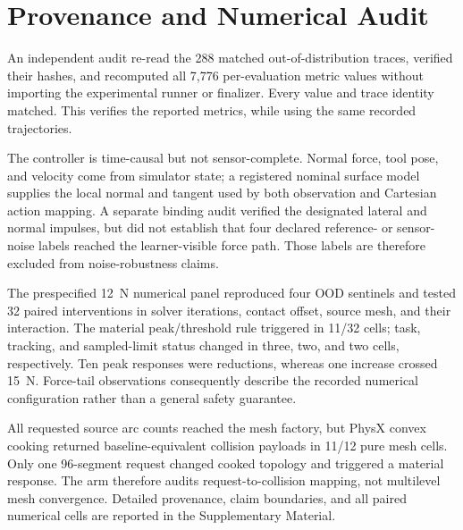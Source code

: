 \section{Provenance and Numerical Audit}
\label{sec:credibility_audit}

An independent audit re-read the 288 matched out-of-distribution traces,
verified their hashes, and recomputed all 7,776 per-evaluation metric values
without importing the experimental runner or finalizer. Every value and trace
identity matched. This verifies the reported metrics, while using the same
recorded trajectories.

The controller is time-causal but not sensor-complete. Normal force, tool pose,
and velocity come from simulator state; a registered nominal surface model
supplies the local normal and tangent used by both observation and Cartesian
action mapping. A separate binding audit verified the designated lateral and
normal impulses, but did not establish that four declared reference- or
sensor-noise labels reached the learner-visible force path. Those labels are
therefore excluded from noise-robustness claims.

The prespecified 12~N numerical panel reproduced four OOD sentinels and tested
32 paired interventions in solver iterations, contact offset, source mesh, and
their interaction. The material peak/threshold rule triggered in 11/32 cells;
task, tracking, and sampled-limit status changed in three, two, and two cells,
respectively. Ten peak responses were reductions, whereas one increase crossed
15~N. Force-tail observations consequently describe the recorded numerical
configuration rather than a general safety guarantee.

All requested source arc counts reached the mesh factory, but PhysX convex
cooking returned baseline-equivalent collision payloads in 11/12 pure mesh
cells. Only one 96-segment request changed cooked topology and triggered a
material response. The arm therefore audits request-to-collision mapping, not
multilevel mesh convergence. Detailed provenance, claim boundaries, and all
paired numerical cells are reported in the Supplementary Material.

